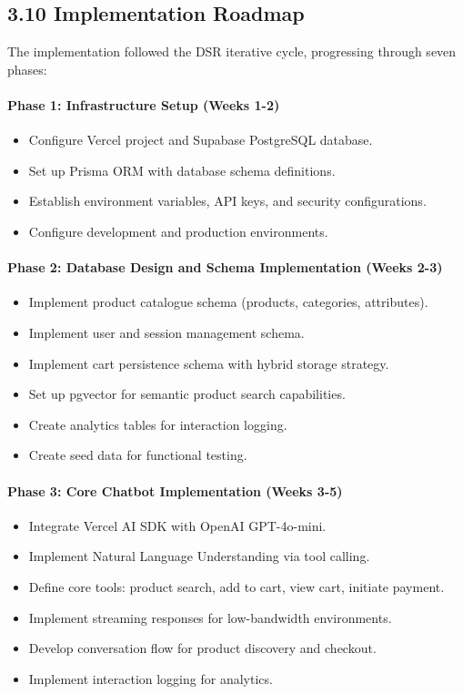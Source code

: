 \documentclass[12pt,a4paper]{article}
\begin{document}
\subsection{3.10 Implementation Roadmap}

The implementation followed the DSR iterative cycle, progressing through seven phases:

\paragraph{Phase 1: Infrastructure Setup (Weeks 1-2)}

\begin{itemize}
    \item Configure Vercel project and Supabase PostgreSQL database.
    \item Set up Prisma ORM with database schema definitions.
    \item Establish environment variables, API keys, and security configurations.
    \item Configure development and production environments.
\end{itemize}

\paragraph{Phase 2: Database Design and Schema Implementation (Weeks 2-3)}

\begin{itemize}
    \item Implement product catalogue schema (products, categories, attributes).
    \item Implement user and session management schema.
    \item Implement cart persistence schema with hybrid storage strategy.
    \item Set up pgvector for semantic product search capabilities.
    \item Create analytics tables for interaction logging.
    \item Create seed data for functional testing.
\end{itemize}

\paragraph{Phase 3: Core Chatbot Implementation (Weeks 3-5)}

\begin{itemize}
    \item Integrate Vercel AI SDK with OpenAI GPT-4o-mini.
    \item Implement Natural Language Understanding via tool calling.
    \item Define core tools: product search, add to cart, view cart, initiate payment.
    \item Implement streaming responses for low-bandwidth environments.
    \item Develop conversation flow for product discovery and checkout.
    \item Implement interaction logging for analytics.
\end{itemize}
\end{document}
